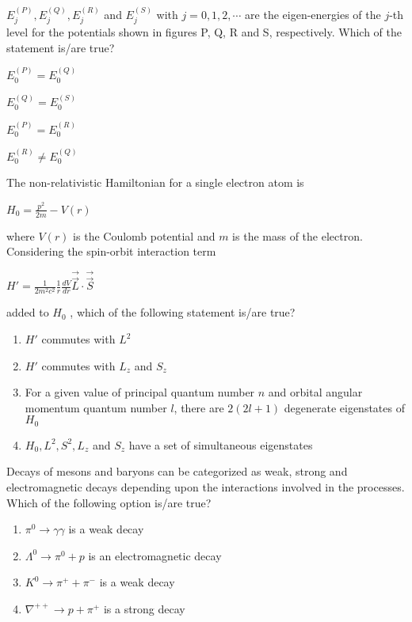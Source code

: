$E_j^{(P)},E_j^{(Q)},E_j^{(R)}$ and $E_j^{(S)}$ with $j=0,1,2,\cdots$ are the eigen-energies of the $j$-th level
for the potentials shown in figures P, Q, R and S, respectively. Which of the statement is/are true? 
\begin{enumerate}
\begin{multicols}{2}
    \item $E_0^{(P)}=E_0^{(Q)}$
    \item $E_0^{(Q)}=E_0^{(S)}$
    \item $E_0^{(P)}=E_0^{(R)}$
    \item $E_0^{(R)}\neq E_0^{(Q)}$
    \end{multicols}
\end{enumerate}
\item The non-relativistic Hamiltonian for a single electron atom is 
\begin{center}
    {$H_0=\frac{p^2}{2m}-V(r)$ \\}
\end{center}
where $V(r)$ is the Coulomb potential and $m$ is the mass of the electron. Considering
the spin-orbit interaction term
\begin{center}
     {$H'=\frac{1}{2m^2c^2}\frac{1}{r}\frac{dV}{dr}\Vec{\overrightarrow{L}}\cdot\Vec{\overrightarrow{S}} $ \\ }
\end{center}
  added to $H_0$ , which of the following statement is/are true?
  \begin{enumerate}
      \item $H'$ commutes with $L^2$
      \item $H'$ commutes with $L_z$ and $S_z$
      \item For a given value of principal quantum number $n$ and orbital angular momentum
quantum number $l$, there are $2(2l+1)$ degenerate eigenstates of $H_0$
\item $H_0,L^2,S^2,L_z$ and $S_z$ have a set of simultaneous eigenstates 
 \end{enumerate}
 \item Decays of mesons and baryons can be categorized as weak, strong and
electromagnetic decays depending upon the interactions involved in the processes.
Which of the following option is/are true?
\begin{enumerate}
    \item $\pi^0\rightarrow\gamma\gamma   $      is a weak decay
    \item $\Lambda^0\rightarrow\pi^0+p$     is an electromagnetic decay
    \item $K^0\rightarrow\pi^++\pi^-$  is a weak decay
    \item $\nabla^{++}\rightarrow p+\pi^+$ is a strong decay
\end{enumerate}
